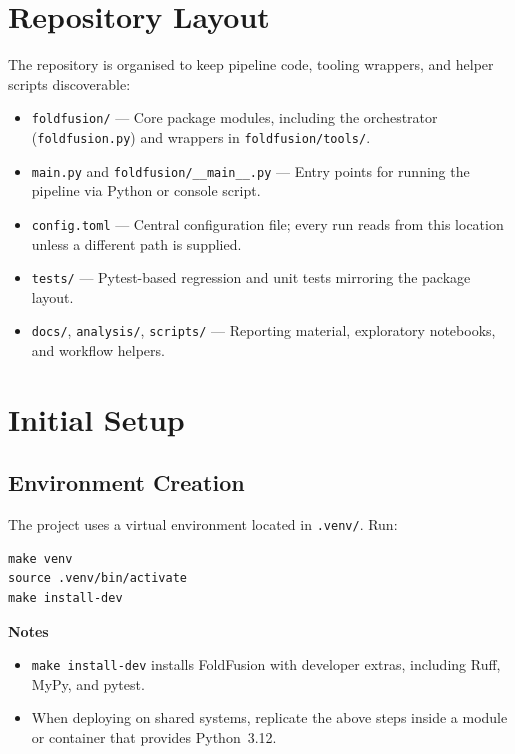 \documentclass[11pt]{article}
\begin{document}
\section{Repository Layout}
The repository is organised to keep pipeline code, tooling wrappers, and helper
scripts discoverable:
\begin{itemize}[noitemsep]
      \item \texttt{foldfusion/} --- Core package modules, including the
            orchestrator (\texttt{foldfusion.py}) and wrappers in
            \texttt{foldfusion/tools/}.
      \item \texttt{main.py} and \texttt{foldfusion/\_\_main\_\_.py} --- Entry
            points for running the pipeline via Python or console script.
      \item \texttt{config.toml} --- Central configuration file; every run reads
            from this location unless a different path is supplied.
      \item \texttt{tests/} --- Pytest-based regression and unit tests mirroring the
            package layout.
      \item \texttt{docs/}, \texttt{analysis/}, \texttt{scripts/} --- Reporting
            material, exploratory notebooks, and workflow helpers.
\end{itemize}

\section{Initial Setup}
\subsection{Environment Creation}
The project uses a virtual environment located in \texttt{.venv/}. Run:

\begin{lstlisting}[style=commandline]
make venv
source .venv/bin/activate
make install-dev
\end{lstlisting}

\noindent\textbf{Notes}
\begin{itemize}[noitemsep]
      \item \texttt{make install-dev} installs FoldFusion with developer extras,
            including Ruff, MyPy, and pytest.
      \item When deploying on shared systems, replicate the above steps inside a
            module or container that provides Python~3.12.
\end{itemize}
\end{document}
